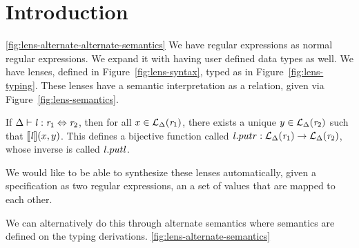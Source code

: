 
\section{Introduction}
\ref{fig:lens-alternate-alternate-semantics}
We have regular expressions as normal regular expressions.
We expand it with having user defined data types as well.
We have lenses, defined in Figure~\ref{fig:lens-syntax}, typed as in Figure~\ref{fig:lens-typing}.
These lenses have a semantic interpretation as a relation, given via Figure~\ref{fig:lens-semantics}.
\begin{theorem}
\label{thm:lens-bij-fcn}
If $\Delta \vdash \mathit{l} : \mathit{r}_1 \Leftrightarrow \mathit{r}_2$,
then for all $x \in \mathcal{L}_{\Delta}(\mathit{r}_1)$, there exists a unique $y \in \mathcal{L}_{\Delta}(\mathit{r}_2)$ such that $[ \! [\mathit{l}] \! ](x,y)$.
This defines a bijective function called $\mathit{l}.putr : \mathcal{L}_{\Delta}(\mathit{r}_1) \rightarrow \mathcal{L}_{\Delta}(\mathit{r}_2)$,
whose inverse is called $\mathit{l}.putl$.
\end{theorem}
We would like to be able to synthesize these lenses automatically, given a
specification as two regular expressions, an a set of values that are
mapped to each other.


We can alternatively do this through alternate semantics where semantics are defined on the typing derivations. \ref{fig:lens-alternate-semantics}

